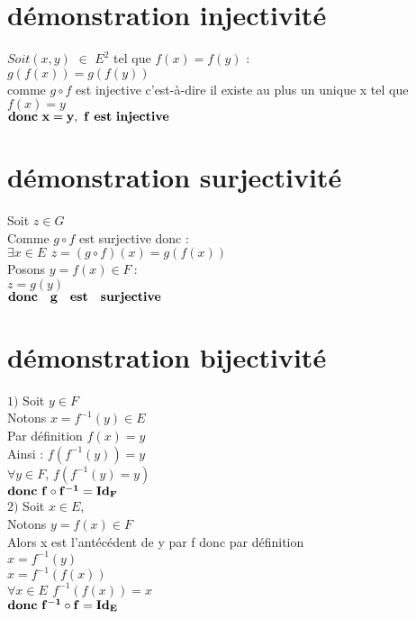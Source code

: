 \documentclass{article}
\begin{document}
	\renewcommand{\thesection}{\Roman{section}}

	\section{d\'emonstration injectivit\'e}

	 $Soit (x,y)$ $\in$ $E^2$ tel que  $f(x)=f(y)$ :\\
	 \setlength{\parindent}{1cm}
 	\indent $g(f(x))=g(f(y))$\\
	\indent comme $g \circ f$ est injective c'est-\`a-dire il existe au plus un unique x tel que $f(x)=y$ \\
		 \setlength{\parindent}{2cm}
	\indent		$\bf donc\  x=y,\  f \ est\ injective$
	\section{d\'emonstration surjectivit\'e}
	Soit $z \in G$\\
	Comme $g \circ f$ est surjective donc :\\
	$\exists x \in E\,\ z=(g \circ f) (x) = g(f(x))$\\
	Posons $y=f(x) \in F \ :$\\
	$z = g(y)$\\
	$\bf donc \quad g \quad est \quad surjective$
	\section{d\'emonstration bijectivit\'e}
	$1)$ Soit $y \in F$\\
	Notons $x=f^{-1}(y) \in E$\\
	Par d\'efinition $f(x)=y$\\
	Ainsi : $f(f^{-1}(y))=y$\\
	$\forall y \in F$, $f(f^{-1}(y)=y)$\\
	$\bf donc \ f \circ f^{-1}=Id_F$\\
	$2)$ Soit $x \in E$,\\
	Notons $y=f(x) \in F$\\
	Alors x est l'ant\'ec\'edent de y par f donc par d\'efinition\\
	$x=f^{-1}(y)$\\
	$x=f^{-1}(f(x))$\\
	$\forall x \in E \, \ f^{-1}(f(x))=x$\\
	$\bf donc \ f^{-1} \circ f = Id_E$
\end{document}
